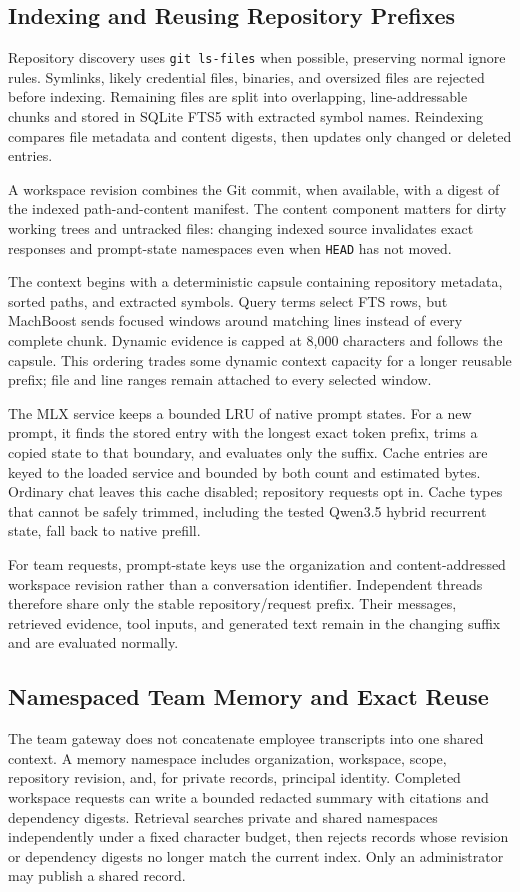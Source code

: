 \documentclass[11pt]{article}
\begin{document}
\subsection{Indexing and Reusing Repository Prefixes}
Repository discovery uses \texttt{git ls-files} when possible, preserving normal
ignore rules. Symlinks, likely credential files, binaries, and oversized files
are rejected before indexing. Remaining files are split into overlapping,
line-addressable chunks and stored in SQLite FTS5 with extracted symbol names.
Reindexing compares file metadata and content digests, then updates only changed
or deleted entries.

A workspace revision combines the Git commit, when available, with a digest of
the indexed path-and-content manifest. The content component matters for dirty
working trees and untracked files: changing indexed source invalidates exact
responses and prompt-state namespaces even when \texttt{HEAD} has not moved.

The context begins with a deterministic capsule containing repository
metadata, sorted paths, and extracted symbols. Query terms select FTS rows, but
MachBoost sends focused windows around matching lines instead of every complete
chunk. Dynamic evidence is capped at 8,000 characters and follows the capsule.
This ordering trades some dynamic context capacity for a longer reusable
prefix; file and line ranges remain attached to every selected window.

The MLX service keeps a bounded LRU of native prompt states. For a new prompt,
it finds the stored entry with the longest exact token prefix, trims a copied
state to that boundary, and evaluates only the suffix. Cache entries are keyed
to the loaded service and bounded by both count and estimated bytes. Ordinary
chat leaves this cache disabled; repository requests opt in. Cache types that
cannot be safely trimmed, including the tested Qwen3.5 hybrid recurrent state,
fall back to native prefill.

For team requests, prompt-state keys use the organization and content-addressed
workspace revision rather than a conversation identifier. Independent threads
therefore share only the stable repository/request prefix. Their messages,
retrieved evidence, tool inputs, and generated text remain in the changing
suffix and are evaluated normally.

\subsection{Namespaced Team Memory and Exact Reuse}
The team gateway does not concatenate employee transcripts into one shared
context. A memory namespace includes organization, workspace, scope, repository
revision, and, for private records, principal identity. Completed workspace
requests can write a bounded redacted summary with citations and dependency
digests. Retrieval searches private and shared namespaces independently under a
fixed character budget, then rejects records whose revision or dependency
digests no longer match the current index. Only an administrator may publish a
shared record.
\end{document}
